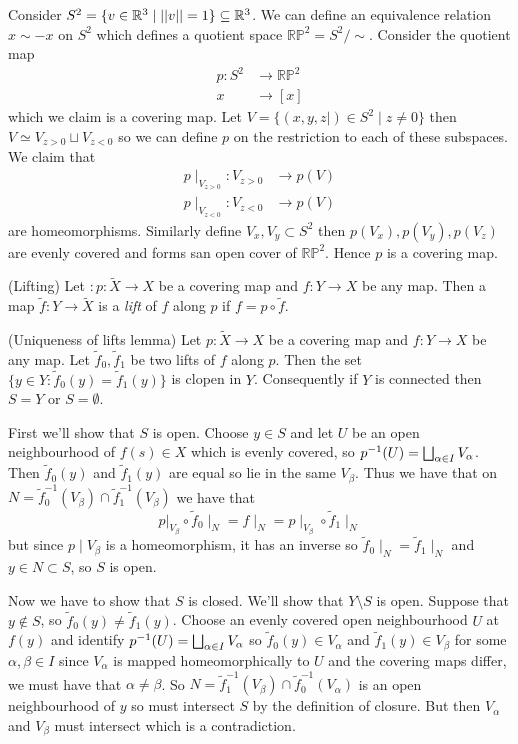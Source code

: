 \documentclass{article}
\newcommand{\RP}{\mathbb{RP}}
\begin{document}
\begin{example}
	Consider $ S^2 = \{ v\in \mathbb{R}^3 \mid ||v|| = 1 \} \subseteq \mathbb{R}^3 $. We can define an equivalence relation $ x\sim -x $ on $ S^2 $ which defines a quotient space $ \RP^2 = S^2 / \sim $. Consider the quotient map
	\begin{align*}
		p: S^2 &\longrightarrow \RP^2 \\
	  x & \longrightarrow [x]
	\end{align*}
	which we claim is a covering map. Let $ V = \{(x,y,z|) \in S^2 \mid z \ne 0\} $ then $ V\simeq V_{z> 0} \sqcup V_{z<0} $ so we can define $ p $ on the restriction to each of these subspaces. We claim that
	\begin{align*}
		p\mid_{V_{z>0}}: V_{z>0} &\to p(V) \\
		p\mid_{V_{z<0}}: V_{z<0} & \to p(V)
	\end{align*}
	are homeomorphisms. Similarly define $ V_x,V_y\subset S^2 $ then $ p(V_x), p(V_y), p(V_z) $ are evenly covered and forms san open cover of $ \RP^2 $. Hence $ p $ is a covering map.
\end{example}
\begin{definition}
	(Lifting) Let $ :p: \tilde X \to X $ be a covering map and $ f: Y \to X $ be any map. Then a map $ \tilde f:Y \to \tilde X $ is a \textit{lift} of $ f $ along $ p $ if $ f = p \circ \tilde f $.
\end{definition}
\begin{lemma}
	(Uniqueness of lifts lemma) Let $ p: \tilde X \to X $ be a covering map and $ f: Y \to X $ be any map. Let $ \tilde f_0, \tilde f_1 $ be two lifts of $ f $ along $ p $. Then the set $ \{y\in Y : \tilde f_0(y) = \tilde f_1(y)\} $ is clopen in $ Y $. Consequently if $ Y $ is connected then $ S = Y $ or $ S = \emptyset $.
\end{lemma}
\pf First we'll show that $ S $ is open. Choose $ y\in S $ and let $ U $ be an open neighbourhood of $ f(s) \in X $ which is evenly covered, so $ {p}^{-1}(U) = \bigsqcup_{\alpha \in I} V_\alpha $. Then $ \tilde f_0(y) $ and $ \tilde f_1(y) $ are equal so lie in the same $ V_\beta $. Thus we have that on $ N = \tilde f_0^{-1}(V_\beta) \cap \tilde f_1^{-1}(V_\beta) $ we have that 
\[
	p|_{V_\beta} \circ \tilde f_0 \mid_N = f\mid_N = p\mid_{V_\beta} \circ \tilde f_1 \mid_N
\]
but since $ p\mid V_\beta $ is a homeomorphism, it has an inverse so $ \tilde f_0\mid_N = \tilde f_1\mid_N $ and $ y\in N \subset S $, so $ S $ is open.\par
Now we have to show that $ S $ is closed. We'll show that $ Y\setminus S $ is open. Suppose that $ y\notin S $, so $ \tilde f_0(y) \ne \tilde f_1(y) $. Choose an evenly covered open neighbourhood $ U $ at $ f(y) $ and identify $ {p}^{-1}(U) = \bigsqcup_{\alpha \in I} V_\alpha  $ so $ \tilde f_0(y) \in V_\alpha $ and $ \tilde f_1(y) \in V_\beta $ for some $ \alpha,\beta\in I $ since $ V_\alpha $ is mapped homeomorphically to $ U $ and the covering maps differ, we must have that $ \alpha\ne \beta $. So $ N = \tilde f_1^{-1}(V_\beta) \cap \tilde f_0^{-1}(V_\alpha) $ is an open neighbourhood of $ y $ so must intersect $ S $ by the definition of closure. But then $ V_\alpha $ and $ V_\beta $ must intersect which is a contradiction.
\end{document}
